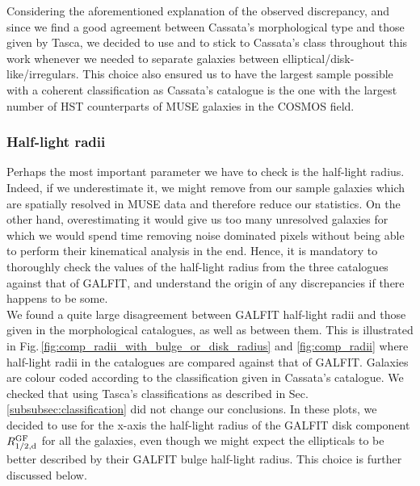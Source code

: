 Considering the aforementioned explanation of the observed discrepancy, and since we find a good agreement between Cassata's morphological type and those given by Tasca, we decided to use and to stick to Cassata's class throughout this work whenever we needed to separate galaxies between elliptical/disk-like/irregulars. This choice also ensured us to have the largest sample possible with a coherent classification as Cassata's catalogue is the one with the largest number of HST counterparts of MUSE galaxies in the COSMOS field.






\newpage
\subsubsection{Half-light radii}
\label{sec:comp_radii}

Perhaps the most important parameter we have to check is the half-light radius. Indeed, if we underestimate it, we might remove from our sample galaxies which are spatially resolved in MUSE data and therefore reduce our statistics. On the other hand, overestimating it would give us too many unresolved galaxies for which we would spend time removing noise dominated pixels without being able to perform their kinematical analysis in the end. Hence, it is mandatory to thoroughly check the values of the half-light radius from the three catalogues against that of GALFIT, and understand the origin of any discrepancies if there happens to be some. \\

We found a quite large disagreement between GALFIT half-light radii and those given in the morphological catalogues, as well as between them. This is illustrated in Fig.\,\ref{fig:comp_radii_with_bulge_or_disk_radius} and \ref{fig:comp_radii} where half-light radii in the catalogues are compared against that of GALFIT. Galaxies are colour coded according to the classification given in Cassata's catalogue. We checked that using Tasca's classifications as described in Sec.\,\ref{subsubsec:classification} did not change our conclusions. In these plots, we decided to use for the x-axis the half-light radius of the GALFIT disk component $R_{1/2 , \rm{d}}^{\rm{GF}}$ for all the galaxies, even though we might expect the ellipticals to be better described by their GALFIT bulge half-light radius. This choice is further discussed below.\\




